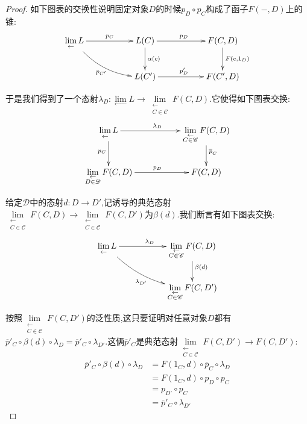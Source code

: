 \begin{enumerate}
\begin{proof}
		如下图表的交换性说明固定对象$D$的时候$p_D\circ p_C$构成了函子$F(-,D)$上的锥:
		$$\xymatrix{\lim\limits_{\leftarrow}L\ar[rr]^{p_C}\ar@/_1pc/[drr]_{p_{C'}}&&L(C)\ar[rr]^{p_D}\ar[d]^{\alpha(c)}&&F(C,D)\ar[d]^{F(c,1_D)}\\&&L(C')\ar[rr]^{p'_D}&&F(C',D)}$$
		
		于是我们得到了一个态射$\lambda_D:\lim\limits_{\leftarrow}L\to\lim\limits_{\substack{\leftarrow\\C\in\mathscr{C}}}F(C,D)$.它使得如下图表交换:
		$$\xymatrix{\lim\limits_{\leftarrow}L\ar[d]_{p_C}\ar[rr]^{\lambda_D}&&\lim\limits_{\substack{\leftarrow\\C\in\mathscr{C}}}F(C,D)\ar[d]^{\overline{p}_C}\\\lim\limits_{\substack{\leftarrow\\D\in\mathscr{D}}}F(C,D)\ar[rr]^{p_D}&&F(C,D)}$$
		
		给定$\mathscr{D}$中的态射$d:D\to D'$,记诱导的典范态射$\lim\limits_{\substack{\leftarrow\\C\in\mathscr{C}}}F(C,D)\to\lim\limits_{\substack{\leftarrow\\C\in\mathscr{C}}}F(C,D')$为$\beta(d)$.我们断言有如下图表交换:
		$$\xymatrix{\lim\limits_{\leftarrow}L\ar[rr]^{\lambda_D}\ar@/_1pc/[drr]_{\lambda_{D'}}&&\lim\limits_{\substack{\leftarrow\\C\in\mathscr{C}}}F(C,D)\ar[d]^{\beta(d)}\\&&\lim\limits_{\substack{\leftarrow\\C\in\mathscr{C}}}F(C,D')}$$
		
		按照$\lim\limits_{\substack{\leftarrow\\C\in\mathscr{C}}}F(C,D')$的泛性质,这只要证明对任意对象$D$都有$\overline{p}'_C\circ\beta(d)\circ\lambda_D=\overline{p}'_C\circ\lambda_{D'}$.这俩$\overline{p}'_C$是典范态射$\lim\limits_{\substack{\leftarrow\\C\in\mathscr{C}}}F(C,D')\to F(C,D')$:
		\begin{align*}
		\overline{p}'_C\circ\beta(d)\circ\lambda_D&=F(1_C,d)\circ\overline{p}_C\circ\lambda_D\\&=F(1_C,d)\circ p_D\circ p_C\\&=p_{D'}\circ p_C\\&=\overline{p}'_C\circ\lambda_{D'}
		\end{align*}


\end{proof}
\end{enumerate}
